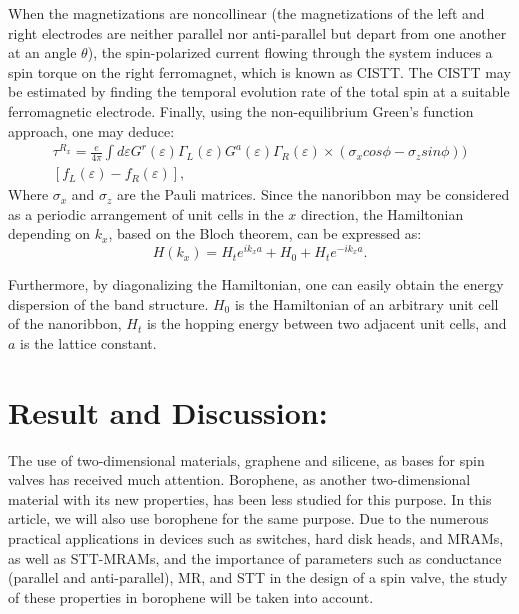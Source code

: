 \documentclass[twoside,twocolumn,9pt]{article}
\begin{document}
When the magnetizations are noncollinear (the magnetizations of the left and right electrodes are neither parallel nor anti-parallel but depart from one another at an angle $\theta$), the spin-polarized current flowing through the system induces a spin torque on the right ferromagnet, which is known as CISTT\cite{slonczewski1989j}. The CISTT may be estimated by finding the temporal evolution rate of the total spin at a suitable ferromagnetic electrode. Finally, using the non-equilibrium Green's function approach, one may deduce:
\begin{equation}
\begin{split}
    \tau^{R_x}=\frac{e}{4\pi}\int{d}\varepsilon G^{r}(\varepsilon)\Gamma_{L}(\varepsilon) G^{a}(\varepsilon) \Gamma _{R}(\varepsilon)
    \times \left( {{\sigma}_{x}}cos\phi -\sigma_{z} sin\phi \right)) \\
    \left[f_{L}(\varepsilon)-f_{R}(\varepsilon)\right],
\end{split}
\end{equation}
Where $\sigma_x$ and $\sigma_z$ are the Pauli matrices. Since the nanoribbon may be considered as a periodic arrangement of unit cells in the $x$ direction, the Hamiltonian depending on $k_x$, based on the Bloch theorem, can be expressed as:
\begin{equation}
    H(k_x) = H_t e^{ik_x a} + H_0 + H_t e^{-i k_x a}.
\end{equation}

Furthermore, by diagonalizing the Hamiltonian, one can easily obtain the energy dispersion of the band structure. $H_0$ is the Hamiltonian of an arbitrary unit cell of the nanoribbon, $H_t$ is the hopping energy between two adjacent unit cells, and $a$ is the lattice constant.

\section{Result and Discussion:}
The use of two-dimensional materials, graphene and silicene, as bases for spin valves has received much attention. Borophene, as another two-dimensional material with its new properties, has been less studied for this purpose. In this article, we will also use borophene for the same purpose. Due to the numerous practical applications in devices such as switches, hard disk heads, and MRAMs, as well as STT-MRAMs, and the importance of parameters such as conductance (parallel and anti-parallel), MR, and STT in the design of a spin valve, the study of these properties in borophene will be taken into account.
\end{document}
